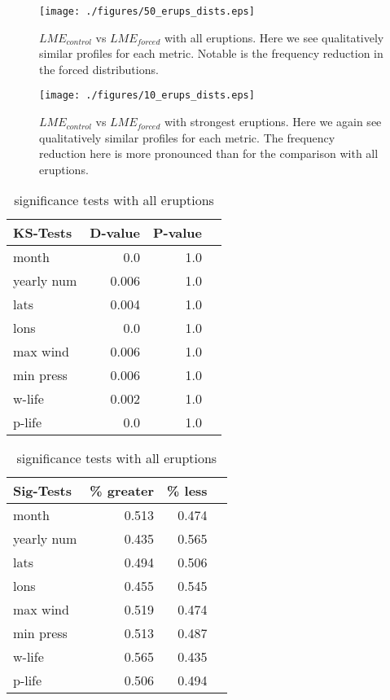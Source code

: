 \documentclass[smallextended]{svjour3}       %
\begin{document}
\begin{figure}[!tbp]
\centering
\texttt{[image: ./figures/50\_erups\_dists.eps]}
\caption{$LME_{control}$ vs $LME_{forced}$ with all eruptions. Here we see qualitatively similar profiles for each metric. Notable is the frequency reduction in the forced distributions. }
\label{50_erups}
\end{figure}

\begin{figure}[!tbp]
\centering
\texttt{[image: ./figures/10\_erups\_dists.eps]}
\caption{$LME_{control}$ vs $LME_{forced}$ with strongest eruptions. Here we again see qualitatively similar profiles for each metric. The frequency reduction here is more pronounced than for the comparison with all eruptions. }
\label{10_erups}
\end{figure}

\begin{table}[!tbp]
\centering
\begin{minipage}[b]{0.45\textwidth}
\begin{tabular}{lrrr}
\toprule
             KS-Tests &     D-value &      P-value\\
\midrule

month & 0.0 & 1.0 \\
yearly num & 0.006 & 1.0 \\
lats & 0.004 & 1.0 \\
lons & 0.0 & 1.0 \\
max wind & 0.006 & 1.0 \\
min press & 0.006 & 1.0 \\
w-life & 0.002 & 1.0 \\
p-life & 0.0 & 1.0 \\

\bottomrule
\end{tabular}
\caption{ks-tests with all eruptions}
\label{ks_all}
\end{minipage}
\hfill
\begin{minipage}[b]{0.45\textwidth}
\begin{tabular}{lrrr}
\toprule
             Sig-Tests & \% greater &  \% less \\
\midrule

month & 0.513 & 0.474 \\
yearly num & 0.435 & 0.565 \\
lats & 0.494 & 0.506 \\
lons & 0.455 & 0.545 \\
max wind & 0.519 & 0.474 \\
min press & 0.513 & 0.487 \\
w-life & 0.565 & 0.435 \\
p-life & 0.506 & 0.494 \\

\bottomrule
\end{tabular}
\caption{significance tests with all eruptions}
\label{sig_all}
\end{minipage}
\end{table}
\end{document}
